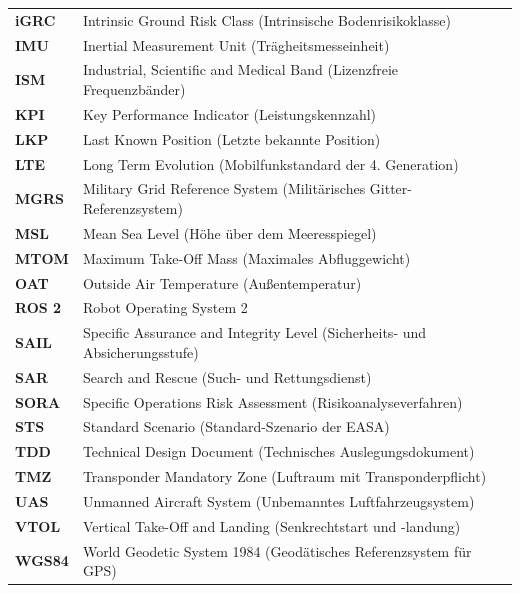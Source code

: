 \documentclass[12pt,a4paper,oneside]{report}
\begin{document}
\begin{longtable}{p{2.5cm} p{11cm}}
    \textbf{iGRC}   & Intrinsic Ground Risk Class (Intrinsische Bodenrisikoklasse) \\
    \textbf{IMU}    & Inertial Measurement Unit (Trägheitsmesseinheit) \\
    \textbf{ISM}    & Industrial, Scientific and Medical Band (Lizenzfreie Frequenzbänder) \\
    \textbf{KPI}    & Key Performance Indicator (Leistungskennzahl) \\
    \textbf{LKP}    & Last Known Position (Letzte bekannte Position) \\
    \textbf{LTE}    & Long Term Evolution (Mobilfunkstandard der 4. Generation) \\
    \textbf{MGRS}   & Military Grid Reference System (Militärisches Gitter-Referenzsystem) \\
    \textbf{MSL}    & Mean Sea Level (Höhe über dem Meeresspiegel) \\
    \textbf{MTOM}   & Maximum Take-Off Mass (Maximales Abfluggewicht) \\
    \textbf{OAT}    & Outside Air Temperature (Außentemperatur) \\
    \textbf{ROS 2}  & Robot Operating System 2 \\
    \textbf{SAIL}   & Specific Assurance and Integrity Level (Sicherheits- und Absicherungsstufe) \\
    \textbf{SAR}    & Search and Rescue (Such- und Rettungsdienst) \\
    \textbf{SORA}   & Specific Operations Risk Assessment (Risikoanalyseverfahren) \\
    \textbf{STS}    & Standard Scenario (Standard-Szenario der EASA) \\
    \textbf{TDD}    & Technical Design Document (Technisches Auslegungsdokument) \\
    \textbf{TMZ}    & Transponder Mandatory Zone (Luftraum mit Transponderpflicht) \\
    \textbf{UAS}    & Unmanned Aircraft System (Unbemanntes Luftfahrzeugsystem) \\
    \textbf{VTOL}   & Vertical Take-Off and Landing (Senkrechtstart und -landung) \\
    \textbf{WGS84}  & World Geodetic System 1984 (Geodätisches Referenzsystem für GPS) \\
\end{longtable}
















\newpage
\end{document}
